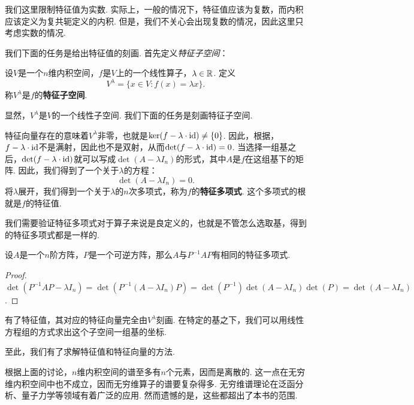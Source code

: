 我们这里限制特征值为实数. 实际上，一般的情况下，特征值应该为复数，而内积应该定义为复共轭定义的内积. 但是，我们不关心会出现复数的情况，因此这里只考虑实数的情况. 

我们下面的任务是给出特征值的刻画. 首先定义\emph{特征子空间}：

\begin{definition}[特征子空间]
设$V$是一个$n$维内积空间，$f$是$V$上的一个线性算子，$\lambda\in\mathbb{R}$. 定义
\[V^\lambda=\{x\in V:f(x)=\lambda x\}.\]
称$V^\lambda$是$f$的\textbf{特征子空间}. 
\end{definition}

显然，$V^\lambda$是$V$的一个线性子空间. 我们下面的任务是刻画特征子空间. 

特征向量存在的意味着$V^\lambda$非零，也就是$\ker(f-\lambda\cdot \mathrm{id})\neq\{0\}$. 因此，根据，$f-\lambda\cdot \mathrm{id}$不是满射，因此也不是双射，从而$\det(f-\lambda\cdot \mathrm{id})=0$. 当选择一组基之后，$\det(f-\lambda\cdot \mathrm{id})$就可以写成$\det(A-\lambda I_n)$的形式，其中$A$是$f$在这组基下的矩阵. 因此，我们得到了一个关于$\lambda$的方程：
\begin{equation}\label{eq:characteristic-equation}
    \det(A-\lambda I_n)=0.
\end{equation}
将$\lambda$展开，我们得到一个关于$\lambda$的$n$次多项式，称为$f$的\textbf{特征多项式}. 这个多项式的根就是$f$的特征值. 

我们需要验证特征多项式对于算子来说是良定义的，也就是不管怎么选取基，得到的特征多项式都是一样的.

\begin{proposition}\label{prop:similar-matrix-same-characteristic-polynomial}
    设$A$是一个$n$阶方阵，$P$是一个可逆方阵，那么$A$与$P^{-1}AP$有相同的特征多项式. 
\end{proposition}
\begin{proof}
    $\det(P^{-1}AP-\lambda I_n)=\det(P^{-1}(A-\lambda I_n)P)=\det(P^{-1})\det(A-\lambda I_n)\det(P)=\det(A-\lambda I_n)$.
\end{proof}

有了特征值，其对应的特征向量完全由$V^\lambda$刻画. 在特定的基之下，我们可以用线性方程组的方式求出这个子空间一组基的坐标. 

至此，我们有了求解特征值和特征向量的方法. 

\begin{remark}
根据上面的讨论，$n$维内积空间的谱至多有$n$个元素，因而是离散的. 这一点在无穷维内积空间中也不成立，因而无穷维算子的谱要复杂得多. 无穷维谱理论在泛函分析、量子力学等领域有着广泛的应用. 然而遗憾的是，这些都超出了本书的范围.
\end{remark}

